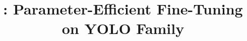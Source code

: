 \documentclass[]{template/mac_automl_style}
\title{\ours: Parameter-Efficient Fine-Tuning on YOLO Family}
\begin{document}
\maketitle






\FloatBarrier
\clearpage





% 
% 
\end{document}
